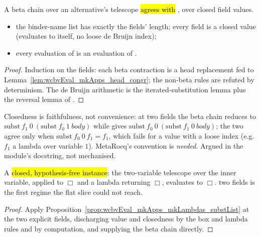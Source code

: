 \begin{proposition}
\label{prop:wcbvEval_mkApps_mkLambdas_substList}
\leanok
{}
 A beta chain over an alternative's telescope \hl{agrees with }, over
closed field values.
\begin{itemize}
\item {} the binder-name list has exactly the fields' length; every field is a closed value
(evaluates to itself, no loose de Bruijn index);
\item {} every evaluation of  is an evaluation of
.
\end{itemize}
\end{proposition}
\begin{proof}
\leanok
{}
 Induction on the fields: each beta contraction is a head replacement fed to
Lemma~\ref{lem:wcbvEval_mkApps_head_congr}; the non-beta  rules are refuted by determinism.
The de Bruijn arithmetic is the iterated-substitution lemma plus the reversal lemma of .
\end{proof}

\begin{remark}
 Closedness is faithfulness, not convenience: at two fields the beta chain reduces to
$\mathrm{subst}\ f_1\ 0\ (\mathrm{subst}\ f_0\ 1\ \mathit{body})$ while  gives
$\mathrm{subst}\ f_0\ 0\ (\mathrm{subst}\ f_1\ 0\ \mathit{body})$; the two agree only when
$\mathrm{subst}\ f_0\ 0\ f_1 = f_1$, which fails for a value with a loose index (e.g. $f_1$ a lambda over
variable $1$). MetaRocq's  convention is \emph{needed}. Argued in the module's docstring,
not mechanised.
\end{remark}

\begin{lemma}
\label{lem:wcbvEval_mkApps_mkLambdas_substList_fires}
\leanok
{}
 A \hl{closed, hypothesis-free instance}: the two-variable telescope over the inner
variable, applied to $\Box$ and a lambda returning $\Box$, evaluates to $\Box$.
 two fields is the first regime the flat slice could not reach.
\end{lemma}
\begin{proof}
\leanok
{}
 Apply Proposition~\ref{prop:wcbvEval_mkApps_mkLambdas_substList} at the two explicit fields,
discharging value and closedness by the box and lambda rules and by computation, and supplying the beta
chain directly.
\end{proof}

